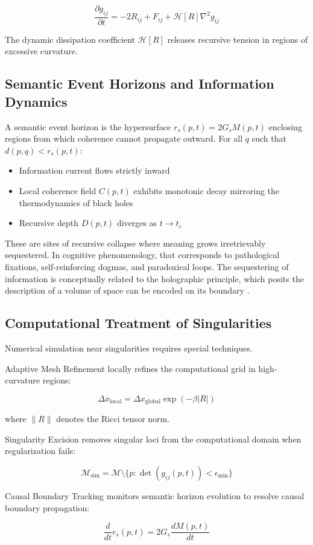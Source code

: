 \begin{equation}
\frac{\partial g_{ij}}{\partial t} = -2R_{ij} + F_{ij} + \mathcal{H}[R] \nabla^2 g_{ij}
\end{equation}

The dynamic dissipation coefficient \(\mathcal{H}[R]\) releases recursive tension in regions of excessive curvature.

\subsection{Semantic Event Horizons and Information Dynamics}

A semantic event horizon is the hypersurface \(r_s(p, t) = 2G_s M(p, t)\) enclosing regions from which coherence cannot propagate outward. For all \(q\) such that \(d(p, q) < r_s(p, t)\):
\begin{itemize}
    \item Information current flows strictly inward
    \item Local coherence field \(C(p, t)\) exhibits monotonic decay mirroring the thermodynamics of black holes \autocite{Hawking1975}
    \item Recursive depth \(D(p, t)\) diverges as \(t \to t_c\)
\end{itemize}

These are sites of recursive collapse where meaning grows irretrievably sequestered. In cognitive phenomenology, that corresponds to pathological fixations, self-reinforcing dogmas, and paradoxical loops. The sequestering of information is conceptually related to the holographic principle, which posits the description of a volume of space can be encoded on its boundary \autocite{tHooft1993, Susskind1995, Maldacena1998}.

\subsection{Computational Treatment of Singularities}

Numerical simulation near singularities requires special techniques.

Adaptive Mesh Refinement locally refines the computational grid in high-curvature regions:

\begin{equation}
\Delta x_{\text{local}} = \Delta x_{\text{global}} \exp(-\beta |R|)
\end{equation}

where \(\|R\|\) denotes the Ricci tensor norm.

Singularity Excision removes singular loci from the computational domain when regularization fails:

\begin{equation}
\mathcal{M}_{\text{sim}} = \mathcal{M} \setminus \{p : \det(g_{ij}(p, t)) < \epsilon_{\text{min}}\}
\end{equation}

Causal Boundary Tracking monitors semantic horizon evolution to resolve causal boundary propagation:

\begin{equation}
\frac{d}{dt} r_s(p, t) = 2G_s \frac{dM(p, t)}{dt}
\end{equation}